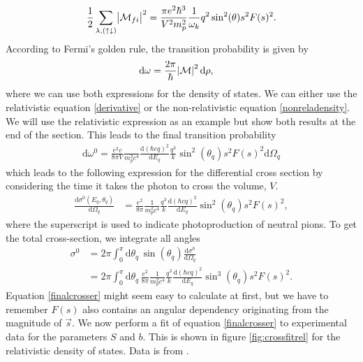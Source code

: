 \begin{equation} \label{absmatrixexact}
	\frac{1}{2}\sum_{\lambda,(\uparrow\downarrow)} \abs{\mathcal{M}_{fi}}^2 = \frac{\pi e^2\hbar^3}{V^2 m_p^2}\frac{1}{\omega_k} q^2\sin^2(\theta) s^2 F(s)^2.
\end{equation}
According to Fermi's golden rule, the transition probability is given by
\begin{align}\label{Fermisgolden}
	\text{d}\omega &= \frac{2\pi}{\hbar}\abs{\mathcal{M}}^2\text{d}\rho,
\end{align}
where we can use both expressions for the density of states. We can either use the relativistic equation \eqref{derivative} or the non-relativistic equation \eqref{nonreladensity}. We will use the relativistic expression as an example but show both results at the end of the section. This leads to the final transition probability
\begin{align}
	\text{d}\omega^0 = \frac{e^2c}{8\pi V}\frac{}{m_p^2 c^4}\frac{\text{d}(\hbar c q)^2}{\text{d}E_q}\frac{q^3}{k} \sin^2(\theta_q) s^2 F(s)^2 \text{d}\Omega_q
\end{align}
which leads to the following expression for the differential cross section by considering the time it takes the photon to cross the volume, $V$.
\begin{align}\label{exactdiffcross}
	\frac{\text{d}\sigma^0(E_q,\theta_q)}{\text{d}\Omega_q} &= \frac{e^2}{8\pi}\frac{1}{m_p^2c^4}\frac{q^3}{k}\frac{\text{d}(\hbar c q)^2}{\text{d}E_q}\sin^2(\theta_q) s^2 F(s)^2,
\end{align}
where the superscript is used to indicate photoproduction of neutral pions. To get the total cross-section, we integrate all angles
\begin{align} \label{exactcross}
	\sigma^0 & = 2\pi \int_0^\pi \text{d}\theta_q \, \sin(\theta_q) \frac{\text{d}\sigma^0}{\text{d}\Omega_q} \\ &= 2\pi \int_0^\pi \text{d}\theta_q \, \frac{e^2}{8\pi}\frac{1}{m_p^2c^4}\frac{q^3}{k}\frac{\text{d}(\hbar c q)^2}{\text{d}E_q}\sin^3(\theta_q) s^2 F(s)^2 \label{finalcrosser}.
\end{align}
Equation \eqref{finalcrosser} might seem easy to calculate at first, but we have to remember $F(s)$ also contains an angular dependency originating from the magnitude of $\vec{s}$. We now perform a fit of equation \eqref{finalcrosser} to experimental data for the parameters $S$ and $b$. This is shown in figure \ref{fig:crossfitrel} for the relativistic density of states. Data is from  \cite{Schmidt_2001}.
